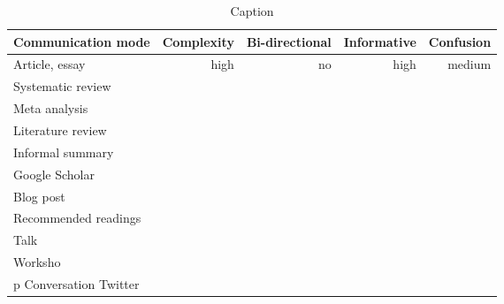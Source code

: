\begin{table*}\centering
{}
\begin{tabular}{@{}lrrrr@{}}\toprule
Communication mode & Complexity & Bi-directional & Informative  & Confusion
\\\midrule
Article, essay & high & no & high & medium  \\
Systematic review \\
Meta analysis \\
Literature review \\
Informal summary \\
Google Scholar \\
Blog post \\
Recommended readings \\
Talk \\
Worksho \\p
Conversation
Twitter


\bottomrule
\end{tabular}
\caption{Caption}
\end{table*}